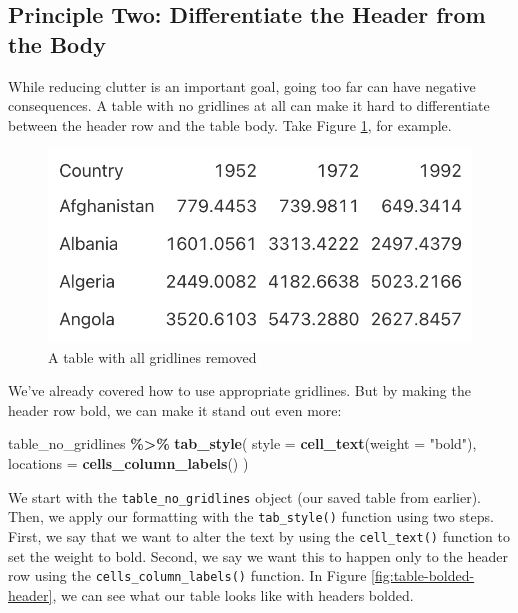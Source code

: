 \documentclass[
]{book}
\newenvironment{Shaded}{\begin{snugshade}}{\end{snugshade}}
\newcommand{\AttributeTok}[1]{\textcolor[rgb]{0.13,0.29,0.53}{#1}}
\newcommand{\FunctionTok}[1]{\textcolor[rgb]{0.13,0.29,0.53}{\textbf{#1}}}
\newcommand{\NormalTok}[1]{#1}
\newcommand{\SpecialCharTok}[1]{\textcolor[rgb]{0.81,0.36,0.00}{\textbf{#1}}}
\newcommand{\StringTok}[1]{\textcolor[rgb]{0.31,0.60,0.02}{#1}}
\begin{document}
\hypertarget{principle-two-differentiate-the-header-from-the-body}{%
\subsection*{Principle Two: Differentiate the Header from the Body}\label{principle-two-differentiate-the-header-from-the-body}}

While reducing clutter is an important goal, going too far can have negative consequences. A table with no gridlines at all can make it hard to differentiate between the header row and the table body. Take Figure \ref{fig:table-no-gridlines-at-all}, for example.

\begin{figure}
\includegraphics[width=1\linewidth]{nostarch/temp/F05004} \caption{A table with all gridlines removed}\label{fig:table-no-gridlines-at-all}
\end{figure}

We've already covered how to use appropriate gridlines. But by making the header row bold, we can make it stand out even more:

\begin{Shaded}
\begin{Highlighting}[]
\NormalTok{table\_no\_gridlines }\SpecialCharTok{\%\textgreater{}\%}
  \FunctionTok{tab\_style}\NormalTok{(}
    \AttributeTok{style =} \FunctionTok{cell\_text}\NormalTok{(}\AttributeTok{weight =} \StringTok{"bold"}\NormalTok{),}
    \AttributeTok{locations =} \FunctionTok{cells\_column\_labels}\NormalTok{()}
\NormalTok{  )}
\end{Highlighting}
\end{Shaded}

We start with the \texttt{table\_no\_gridlines} object (our saved table from earlier). Then, we apply our formatting with the \texttt{tab\_style()} function using two steps. First, we say that we want to alter the text by using the \texttt{cell\_text()} function to set the weight to bold. Second, we say we want this to happen only to the header row using the \texttt{cells\_column\_labels()} function. In Figure \ref{fig:table-bolded-header}, we can see what our table looks like with headers bolded.
\end{document}
